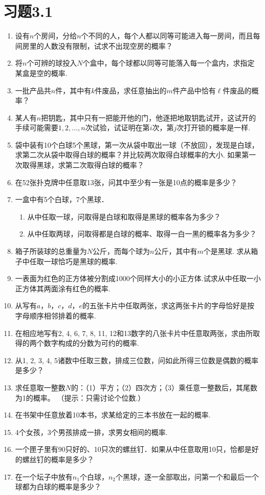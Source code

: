 \section*{习题3.1}
\begin{enumerate}
\item 设有$n$个房间，分给$n$个不同的人，每个人都以同等可能进入每一房间，而且每间房里的人数没有限制，试求不出现空房的概率？
\item 将$n$个可辨的球投入$N$个盒中，每个球都以同等可能落入每一个盒内，求指定某盒是空的概率.
\item 一批产品共$n$件，其中有$k$件废品，求任意抽出的$m$件产品中恰有$\ell$件废品的概率？
\item 某人有$n$把钥匙，其中只有一把能开他的门，他逐把地取钥匙试开，这试开的手续可能需要$1,2,\ldots,n$次试验，试证明在第$i$次，第$j$次打开锁的概率是一样.
\item 袋中装有10个白球5个黑球，第一次从袋中取出一球（不放回），发现是白球，求第二次从袋中取得白球的概率？并比较两次取得白球概率的大小. 如果第一次取得黑球，求第二次取得白球的概率？
\item 在52张扑克牌中任意取13张，问其中至少有一张是10点的概率是多少？
\item 一盒中有5个白球，7个黑球．
\begin{enumerate}[(1)]
    \item 从中任取一球，问取得是白球和取得是黑球的概率各为多少？
    \item 从中任取两球，问取得都是白球的概率、取得一白一黑的概率各为多少？
\end{enumerate}

\item 箱子所装球的总重量为$N$公斤，而每个球为$n$公斤，其中有$m$个是黑球. 求从箱子中任取一球恰巧是黑球的概率.
\item 一表面为红色的正方体被分割成1000个同样大小的小正方体.试求从中任取一小正方体其两面涂有红色的概率.
\item 从写有$a$，$b$，$c$，$d$，$e$的五张卡片中任取两张，求这两张卡片的字母恰好是按字母顺序相邻排着的概率.
\item 在相应地写有2, 4, 6, 7, 8, 11, 12和13数字的八张卡片中任意取两张，求由所取得的两个数字构成的分数为可约的概率.
\item 从1, 2, 3, 4, 5诸数中任取三数，排成三位数，问如此所得三位数是偶数的概率是多少？
\item 求任意取一整数$N$的：（1）平方；（2）四次方；（3）乘任意一整数后，其尾数为1的概率。
（提示：只需讨论个位数.）
\item 在书架中任意放着10本书，求某给定的三本书放在一起的概率.
\item 4个女孩，3个男孩排成一排，求男女相间的概率.
\item 一个匣子里有90只好的、10只次的螺丝钉．如果从中任意取用10只，恰都是好的螺丝钉的概率是多少？
\item 在一个坛子中放有$n_1$个白球，$n_2$个黑球，逐一全部取出，问第一个和最后一个球都为白球的概率是多少？


\end{enumerate}
